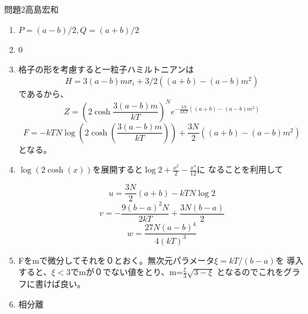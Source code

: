 \documentclass[fleqn]{jbook}
\begin{document}
\begin{answer}{問題2}{高島宏和}
\begin{enumerate}
\item $P=(a-b)/2,Q=(a+b)/2$
\item 0
\item 格子の形を考慮すると一粒子ハミルトニアンは
\begin{equation}
H=3(a-b)m\sigma_i+3/2((a+b)-(a-b)m^2)
\end{equation}
であるから、
\begin{equation}
Z={\left(2\cosh{\frac{3(a-b)m}{kT}}\right)}^N e^{-\frac{3N}{2KT}{((a+b)-(a-b)m^2)}}
\end{equation}
\begin{equation}
F=-kTN\log \left(2\cosh \left(\frac{3(a-b)m}{kT}\right)  \right)+\frac{3N}{2}((a+b)-(a-b)m^2)
\end{equation}
となる。
\item $\log (2\cosh(x))$を展開すると$\log2 +\frac{x^2}{2}-\frac{x^4}{12}$に
なることを利用して

\begin{equation}
 u=\frac{3N}{2}(a+b)-kTN\log 2
\end{equation}
\begin{equation}
 v=-\frac{9(b-a)^2N}{2kT}+\frac{3N(b-a)}{2}
\end{equation}
\begin{equation}
 w=\frac{27N(a-b)^4}{4(kT)^3}
\end{equation}
\item Fをmで微分してそれを０とおく。無次元パラメータ$\xi=kT/(b-a)$を
導入すると、$\xi<3$でmが０でない値をとり、m=$\frac{\xi}{3}\sqrt{3-\xi}$
となるのでこれをグラフに書けば良い。
\item 相分離
\end{enumerate}
\end{answer}
\end{document}
